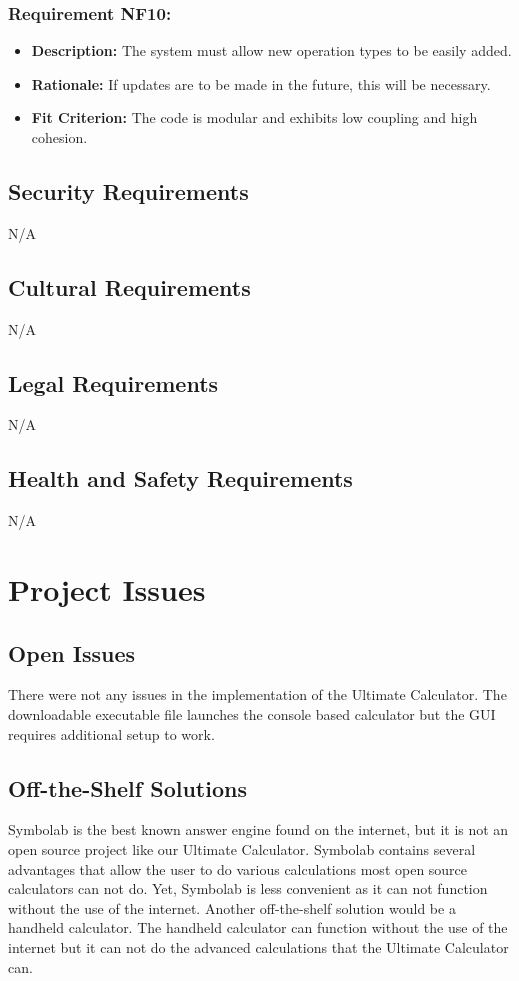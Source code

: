 \documentclass[12pt, titlepage]{article}
\begin{document}
\subsubsection*{Requirement NF10:}
\begin{itemize}
  \item \textbf{Description:} The system must allow new operation types to be easily added.
  \item \textbf{Rationale:} If updates are to be made in the future, this will be necessary.
  \item \textbf{Fit Criterion:} The code is modular and exhibits low coupling and high cohesion.
\end{itemize}

\subsection{Security Requirements}
N/A

\subsection{Cultural Requirements}
N/A
\subsection{Legal Requirements}
N/A
\subsection{Health and Safety Requirements}
N/A

\section{Project Issues}

\subsection{Open Issues}
There were not any issues in the implementation of the Ultimate Calculator. The downloadable executable file launches the console based calculator but the GUI requires additional setup to work.
\subsection{Off-the-Shelf Solutions}
Symbolab is the best known answer engine found on the internet, but it is not an open source project like our Ultimate Calculator. Symbolab contains several advantages that allow the user to do various calculations most open source calculators can not do. Yet, Symbolab is less convenient as it can not function without the use of the internet. Another off-the-shelf solution would be a handheld calculator. The handheld calculator can function without the use of the internet but it can not do the advanced calculations that the Ultimate Calculator can.
\end{document}
